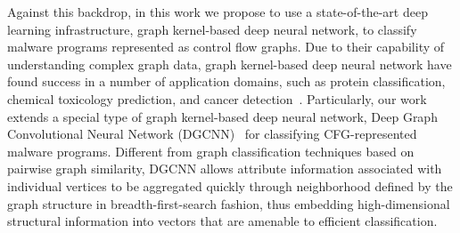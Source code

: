 Against this backdrop, in this work we propose to use a state-of-the-art deep learning infrastructure, graph kernel-based deep neural network, to classify malware programs represented as control flow graphs.
Due to their capability of understanding complex graph data, graph kernel-based deep neural network have found success in a number of application domains,
such as protein classification, chemical toxicology prediction, and cancer detection~\cite{ToxicologyPredict, ProteinDataset, SimonovskyEcc, Dgcnn}.
Particularly, our work extends a special type of graph kernel-based deep neural network, Deep Graph Convolutional Neural Network (DGCNN)~\cite{Dgcnn} for classifying CFG-represented malware programs.
Different from graph classification techniques based on pairwise graph similarity,
DGCNN allows attribute information associated with individual vertices to be aggregated quickly through neighborhood defined by the graph structure in breadth-first-search fashion,
thus embedding high-dimensional structural information into vectors that are amenable to efficient classification.



